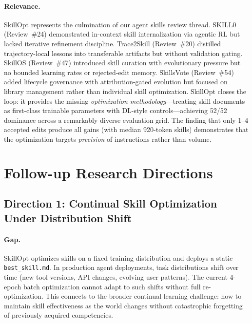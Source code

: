 \documentclass[11pt,a4paper]{article}
\begin{document}
\paragraph{Relevance.}
SkillOpt represents the culmination of our agent skills review thread. SKILL0 (Review~\#24) demonstrated in-context skill internalization via agentic RL but lacked iterative refinement discipline. Trace2Skill (Review~\#20) distilled trajectory-local lessons into transferable artifacts but without validation gating. SkillOS (Review~\#47) introduced skill curation with evolutionary pressure but no bounded learning rates or rejected-edit memory. SkillsVote (Review~\#54) added lifecycle governance with attribution-gated evolution but focused on library management rather than individual skill optimization. SkillOpt closes the loop: it provides the missing \emph{optimization methodology}---treating skill documents as first-class trainable parameters with DL-style controls---achieving 52/52 dominance across a remarkably diverse evaluation grid. The finding that only 1--4 accepted edits produce all gains (with median 920-token skills) demonstrates that the optimization targets \emph{precision} of instructions rather than volume.

\section*{Follow-up Research Directions}

\subsection*{Direction 1: Continual Skill Optimization Under Distribution Shift}

\paragraph{Gap.}
SkillOpt optimizes skills on a fixed training distribution and deploys a static \texttt{best\_skill.md}. In production agent deployments, task distributions shift over time (new tool versions, API changes, evolving user patterns). The current 4-epoch batch optimization cannot adapt to such shifts without full re-optimization. This connects to the broader continual learning challenge: how to maintain skill effectiveness as the world changes without catastrophic forgetting of previously acquired competencies.
\end{document}
